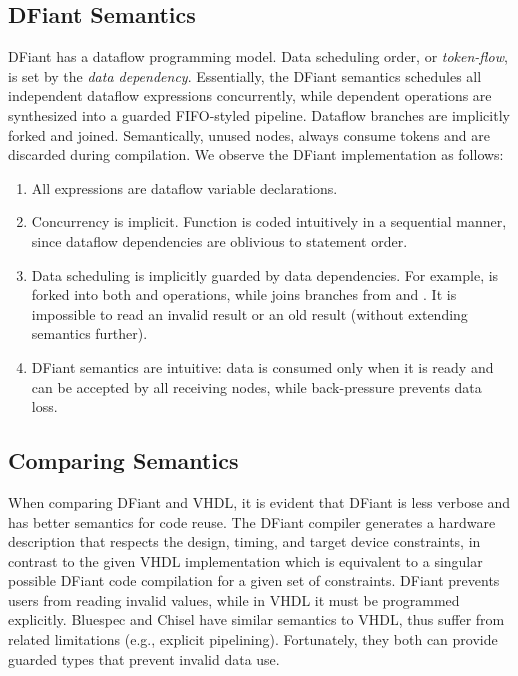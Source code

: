 \subsection{DFiant Semantics}
DFiant has a dataflow programming model. Data scheduling order, or \textit{token-flow}, is set by the \textit{data dependency}. Essentially, the DFiant semantics schedules all independent dataflow expressions concurrently, while dependent operations are synthesized into a guarded FIFO-styled pipeline. Dataflow branches are implicitly forked and joined. Semantically, unused nodes, always consume tokens and are discarded during compilation. We observe the DFiant  implementation as follows:

\begin{enumerate}[leftmargin=*]
  \item All expressions are dataflow variable declarations.
  \item Concurrency is implicit. Function  is coded intuitively in a sequential manner, since dataflow dependencies are oblivious to statement order. 
  \item Data scheduling is implicitly guarded by data dependencies. For example,  is forked into both  and  operations, while  joins branches from  and .
  It is impossible to read an invalid result or an old result (without extending semantics further).
  \item DFiant semantics are intuitive: data is consumed only when it is ready and can be accepted by all receiving nodes, while back-pressure prevents data loss. 
\end{enumerate} 
   

\subsection{Comparing Semantics}
When comparing DFiant and VHDL, it is evident that DFiant is less verbose and has better semantics for code reuse. The DFiant compiler generates a hardware description that respects the design, timing, and target device constraints, in contrast to the given VHDL implementation which is equivalent to a singular possible DFiant code compilation for a given set of constraints.
DFiant prevents  users from reading invalid values, while in VHDL it must be programmed explicitly. Bluespec and Chisel have similar semantics to VHDL, thus suffer from related limitations (e.g., explicit pipelining). Fortunately, they both can provide guarded types that prevent invalid data use.

